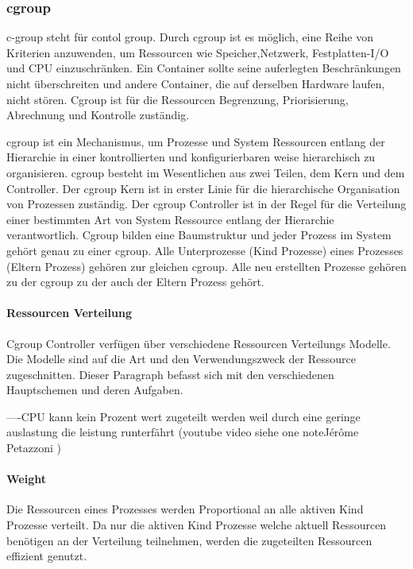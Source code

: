 \documentclass[12pt,a4paper,bibliography=totocnumbered,listof=totocnumbered]{scrartcl}
\begin{document}
\subsubsection{cgroup}
\glqq c-group\grqq{} steht für \glqq contol group\grqq{}. Durch cgroup ist es möglich, eine Reihe von Kriterien anzuwenden, um Ressourcen wie Speicher,Netzwerk, Festplatten-I/O und CPU einzuschränken. Ein Container sollte seine auferlegten Beschränkungen nicht überschreiten und andere Container, die auf derselben Hardware laufen, nicht stören. Cgroup ist für die Ressourcen Begrenzung, Priorisierung, Abrechnung und Kontrolle zuständig.\cite{Heo2015ControlV2} 

cgroup ist ein Mechanismus, um Prozesse und System Ressourcen entlang der Hierarchie in einer kontrollierten und konfigurierbaren weise hierarchisch zu organisieren. cgroup besteht im Wesentlichen aus zwei Teilen, dem Kern und dem Controller. Der cgroup Kern ist in erster Linie für die hierarchische Organisation von Prozessen zuständig. Der cgroup Controller ist in der Regel für die Verteilung einer bestimmten Art von System Ressource entlang der Hierarchie verantwortlich. Cgroup bilden eine Baumstruktur und jeder Prozess im System gehört genau zu einer cgroup. Alle Unterprozesse (Kind Prozesse) eines Prozesses (Eltern Prozess) gehören zur gleichen cgroup. Alle neu erstellten Prozesse gehören zu der cgroup zu der auch der Eltern Prozess gehört.


\paragraph{Ressourcen Verteilung}
Cgroup Controller verfügen über verschiedene Ressourcen Verteilungs Modelle. Die Modelle sind auf die Art und den Verwendungszweck der Ressource zugeschnitten. Dieser Paragraph befasst sich mit den verschiedenen Hauptschemen und deren Aufgaben.

----CPU kann kein Prozent wert zugeteilt werden weil durch eine geringe auslastung die leistung runterfährt (youtube video siehe one noteJérôme Petazzoni )

\paragraph{Weight}
Die Ressourcen eines Prozesses werden Proportional an alle aktiven Kind Prozesse verteilt. Da nur die aktiven Kind Prozesse welche aktuell Ressourcen benötigen an der Verteilung teilnehmen, werden die zugeteilten Ressourcen effizient genutzt. 
\end{document}
